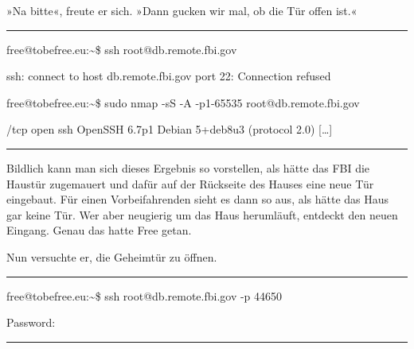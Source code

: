 »Na bitte«, freute er sich. »Dann gucken wir mal, ob die Tür offen ist.«

\noindent \parbox{\textwidth}{ \vspace{3ex} \hrule \vspace{3ex}

    \begin{footnotesize}
    \begin{ttfamily}

\noindent free@tobefree.eu:\textasciitilde{}\$ ssh root@db.remote.fbi.gov

\noindent ssh: connect to host db.remote.fbi.gov port 22: Connection refused

\noindent free@tobefree.eu:\textasciitilde{}\$ sudo nmap -sS -A -p1-65535 root@db.remote.fbi.gov

/tcp open  ssh     OpenSSH 6.7p1 Debian 5+deb8u3 (protocol 2.0) […]

    \end{ttfamily}
    \end{footnotesize}

\vspace{3ex} \hrule \vspace{3ex} }

Bildlich kann man sich dieses Ergebnis so vorstellen, als hätte das FBI die Haustür zugemauert und dafür auf der Rückseite des Hauses eine neue Tür eingebaut. Für einen Vorbeifahrenden sieht es dann so aus, als hätte das Haus gar keine Tür. Wer aber neugierig um das Haus herumläuft, entdeckt den neuen Eingang. Genau das hatte Free getan.

Nun versuchte er, die Geheimtür zu öffnen.

\noindent \parbox{\textwidth}{ \vspace{3ex} \hrule \vspace{3ex}

    \begin{footnotesize}
    \begin{ttfamily}

\noindent free@tobefree.eu:\textasciitilde{}\$ ssh root@db.remote.fbi.gov -p 44650

\noindent Password:

    \end{ttfamily}
    \end{footnotesize}

\vspace{3ex} \hrule \vspace{3ex} }

